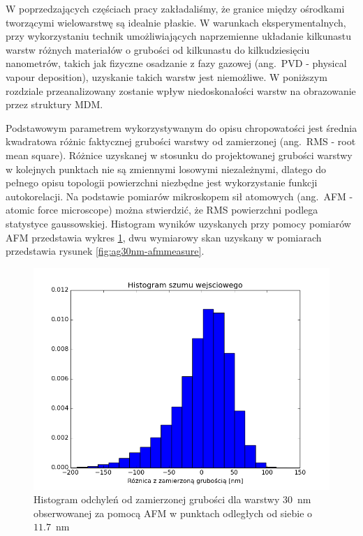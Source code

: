 W poprzedzających częściach pracy zakładaliśmy, że granice między ośrodkami tworzącymi wielowarstwę są idealnie płaskie. W warunkach eksperymentalnych, przy wykorzystaniu technik umożliwiających naprzemienne układanie kilkunastu warstw różnych materiałów o grubości od kilkunastu do kilkudziesięciu nanometrów,  takich jak fizyczne osadzanie z fazy gazowej (ang.~PVD - physical vapour deposition), uzyskanie takich warstw jest niemożliwe. W poniższym rozdziale przeanalizowany zostanie wpływ niedoskonałości warstw na obrazowanie przez struktury MDM.

Podstawowym parametrem wykorzystywanym do opisu chropowatości jest średnia kwadratowa różnic faktycznej grubości warstwy od zamierzonej (ang.~RMS - root mean square). Różnice uzyskanej w stosunku do projektowanej grubości warstwy w kolejnych punktach nie są zmiennymi losowymi niezależnymi, dlatego do pełnego opisu topologii powierzchni niezbędne jest wykorzystanie funkcji autokorelacji\cite{stefaniuk2011effect}. Na podstawie pomiarów mikroskopem sił atomowych (ang.~AFM - atomic force microscope) można stwierdzić, że RMS powierzchni podlega statystyce gaussowskiej. Histogram wyników uzyskanych przy pomocy pomiarów AFM przedstawia wykres \ref{fig:ag30nm-afmhist}, dwu wymiarowy skan uzyskany w pomiarach przedstawia rysunek \ref{fig:ag30nm-afmmeasure}.

\begin{figure}[bt]
		\includegraphics[width=\textwidth]{images/multilayer/ag30nm-afm-measure-hist.png}
		\caption{Histogram odchyleń od zamierzonej grubości dla warstwy $30$~nm obserwowanej za pomocą AFM w punktach odległych od siebie o $11.7$~nm} 		\label{fig:ag30nm-afmhist}
\end{figure}

